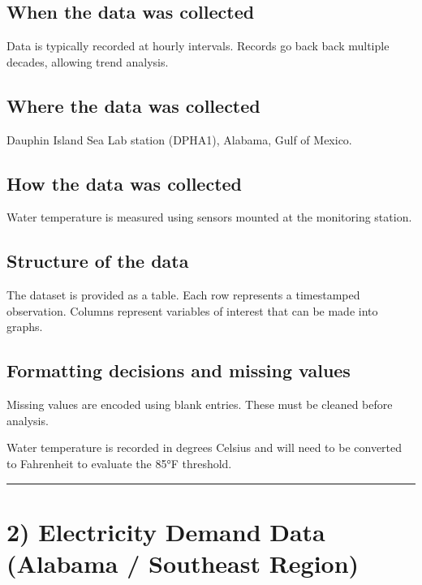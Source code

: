 \documentclass[
  letterpaper,
  DIV=11,
  numbers=noendperiod]{scrreprt}
\begin{document}
\subsection{When the data was
collected}\label{when-the-data-was-collected}

Data is typically recorded at hourly intervals. Records go back back
multiple decades, allowing trend analysis.

\subsection{Where the data was
collected}\label{where-the-data-was-collected}

Dauphin Island Sea Lab station (DPHA1), Alabama, Gulf of Mexico.

\subsection{How the data was
collected}\label{how-the-data-was-collected}

Water temperature is measured using sensors mounted at the monitoring
station.

\subsection{Structure of the data}\label{structure-of-the-data}

The dataset is provided as a table. Each row represents a timestamped
observation. Columns represent variables of interest that can be made
into graphs.

\subsection{Formatting decisions and missing
values}\label{formatting-decisions-and-missing-values}

Missing values are encoded using blank entries. These must be cleaned
before analysis.

Water temperature is recorded in degrees Celsius and will need to be
converted to Fahrenheit to evaluate the 85°F threshold.

\begin{center}\rule{0.5\linewidth}{0.5pt}\end{center}

\section{2) Electricity Demand Data (Alabama / Southeast
Region)}\label{electricity-demand-data-alabama-southeast-region}
\end{document}
